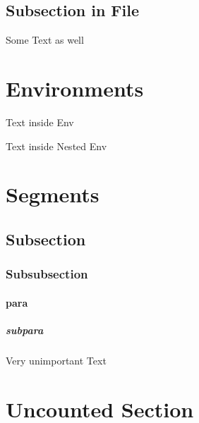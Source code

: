 \subsection{Subsection in File}
Some Text as well

\section{Environments}
\begin{Some_Env}
Text inside Env

\begin{Nested_Env}
Text inside Nested Env

\end{Nested_Env}
\end{Some_Env}
\section{Segments}
\subsection{Subsection}
\subsubsection{Subsubsection}
\paragraph{para}
\subparagraph{subpara}
Very unimportant Text

\section*{Uncounted Section}

